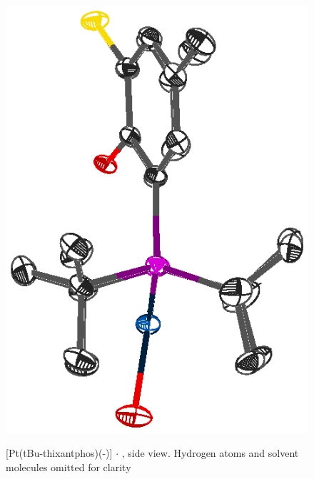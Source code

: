 \begin{figure}[ht]
\begin{center}
\vspace{0.5cm}
\includegraphics{../Figures/Crystalplatinumdioxygenside.eps}
\caption[X-ray crystal structure of [Pt(tBu-thixantphos)(\hapto{}-){]} $\cdot{}$  side view]{[Pt(tBu-thixantphos)(\hapto{}-)] $\cdot{}$ , side view.  Hydrogen atoms and solvent molecules omitted for clarity}
\vspace{0.2cm}
\label{crystal:dioxygenside}
\end{center}
\end{figure}
\vspace{0.2cm}

